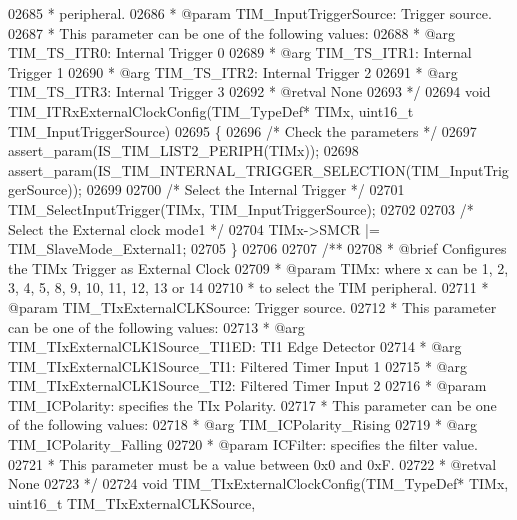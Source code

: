 \begin{DoxyCode}
02685 \textcolor{comment}{  *         peripheral.}
02686 \textcolor{comment}{  * @param  TIM\_InputTriggerSource: Trigger source.}
02687 \textcolor{comment}{  *          This parameter can be one of the following values:}
02688 \textcolor{comment}{  *            @arg TIM\_TS\_ITR0: Internal Trigger 0}
02689 \textcolor{comment}{  *            @arg TIM\_TS\_ITR1: Internal Trigger 1}
02690 \textcolor{comment}{  *            @arg TIM\_TS\_ITR2: Internal Trigger 2}
02691 \textcolor{comment}{  *            @arg TIM\_TS\_ITR3: Internal Trigger 3}
02692 \textcolor{comment}{  * @retval None}
02693 \textcolor{comment}{  */}
02694 \textcolor{keywordtype}{void} TIM_ITRxExternalClockConfig(TIM\_TypeDef* TIMx, uint16\_t TIM\_InputTriggerSource)
02695 \{
02696   \textcolor{comment}{/* Check the parameters */}
02697   assert_param(IS\_TIM\_LIST2\_PERIPH(TIMx));
02698   assert_param(IS\_TIM\_INTERNAL\_TRIGGER\_SELECTION(TIM\_InputTriggerSource));
02699 
02700   \textcolor{comment}{/* Select the Internal Trigger */}
02701   TIM_SelectInputTrigger(TIMx, TIM\_InputTriggerSource);
02702 
02703   \textcolor{comment}{/* Select the External clock mode1 */}
02704   TIMx->SMCR |= TIM_SlaveMode_External1;
02705 \}
02706 
02707 \textcolor{comment}{/**}
02708 \textcolor{comment}{  * @brief  Configures the TIMx Trigger as External Clock}
02709 \textcolor{comment}{  * @param  TIMx: where x can be 1, 2, 3, 4, 5, 8, 9, 10, 11, 12, 13 or 14  }
02710 \textcolor{comment}{  *         to select the TIM peripheral.}
02711 \textcolor{comment}{  * @param  TIM\_TIxExternalCLKSource: Trigger source.}
02712 \textcolor{comment}{  *          This parameter can be one of the following values:}
02713 \textcolor{comment}{  *            @arg TIM\_TIxExternalCLK1Source\_TI1ED: TI1 Edge Detector}
02714 \textcolor{comment}{  *            @arg TIM\_TIxExternalCLK1Source\_TI1: Filtered Timer Input 1}
02715 \textcolor{comment}{  *            @arg TIM\_TIxExternalCLK1Source\_TI2: Filtered Timer Input 2}
02716 \textcolor{comment}{  * @param  TIM\_ICPolarity: specifies the TIx Polarity.}
02717 \textcolor{comment}{  *          This parameter can be one of the following values:}
02718 \textcolor{comment}{  *            @arg TIM\_ICPolarity\_Rising}
02719 \textcolor{comment}{  *            @arg TIM\_ICPolarity\_Falling}
02720 \textcolor{comment}{  * @param  ICFilter: specifies the filter value.}
02721 \textcolor{comment}{  *          This parameter must be a value between 0x0 and 0xF.}
02722 \textcolor{comment}{  * @retval None}
02723 \textcolor{comment}{  */}
02724 \textcolor{keywordtype}{void} TIM_TIxExternalClockConfig(TIM\_TypeDef* TIMx, uint16\_t TIM\_TIxExternalCLKSource,

\end{DoxyCode}
